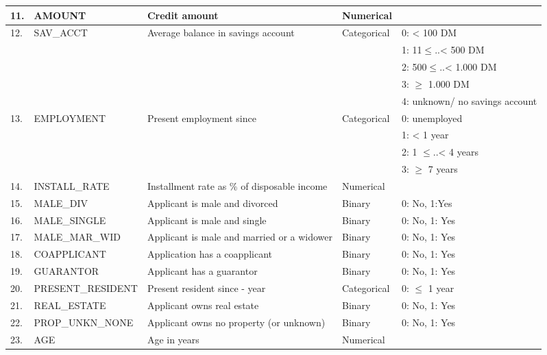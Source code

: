 \begin{table}
\begin{tabular}{|p{0.6cm}|p{2.6cm}|p{5cm}|p{2cm}|p{4.5cm}|}
	{\tiny 11.}	& {\tiny AMOUNT} & {\tiny Credit amount}  & {\tiny Numerical} &  \\ \hline
	{\tiny 12.}	& {\tiny SAV\_ACCT} & {\tiny Average balance in savings account} & {\tiny Categorical} & {\tiny 0: < 100 DM} \\
		&  &  &  & {\tiny 1: 11$\leq$..< 500 DM}\\
		&  &  &  & {\tiny 2: 500$\leq$..< 1.000 DM} \\
		&  &  &  & {\tiny 3: $\geq$ 1.000 DM} \\
		&  &  &  &{\tiny  4: unknown/ no savings account} \\ \hline
	{\tiny 13.}	& {\tiny EMPLOYMENT} & {\tiny Present employment since} & {\tiny Categorical}  & {\tiny 0: unemployed} \\
		&  &  &  & {\tiny 1: < 1 year}\\
		&  &  &  & {\tiny 2: 1 $\leq$..< 4 years} \\
		&  &  &  & {\tiny 3: $\geq$ 7 years} \\ \hline
	{\tiny 14.}	& {\tiny INSTALL\_RATE}  & {\tiny Installment rate as \% of disposable income} & {\tiny Numerical}  &  \\ \hline
	{\tiny 15.}	& {\tiny MALE\_DIV} & {\tiny Applicant is male and divorced} & {\tiny Binary} & {\tiny 0: No, 1:Yes} \\ \hline
	{\tiny 16.	}& {\tiny MALE\_SINGLE} & {\tiny Applicant is male and single} & {\tiny Binary} & {\tiny 0: No, 1: Yes} \\ \hline
	{\tiny 17.}	& {\tiny MALE\_MAR\_WID} & {\tiny Applicant is male and married or a widower} & {\tiny Binary}  & {\tiny 0: No, 1: Yes }\\ \hline
	{\tiny 18.} & {\tiny CO\-APPLICANT} & {\tiny Application has a co\-applicant} & {\tiny Binary} & {\tiny 0: No, 1: Yes} \\ \hline
	{\tiny 19.} & {\tiny GUARANTOR} & {\tiny Applicant has a guarantor} & {\tiny Binary} & {\tiny 0: No, 1: Yes} \\ \hline
	{\tiny 20.} & {\tiny PRESENT\_RESIDENT} & {\tiny Present resident since - year} & {\tiny Categorical} &{\tiny  0: $\leq$ 1 year} \\ \hline
	{\tiny 21.} & {\tiny REAL\_ESTATE }& {\tiny Applicant owns real estate} & {\tiny Binary} & {\tiny 0: No, 1: Yes} \\ \hline
	{\tiny 22.} & {\tiny PROP\_UNKN\_NONE} & {\tiny Applicant owns no property (or unknown)} & {\tiny Binary} & {\tiny 0: No, 1: Yes} \\ \hline
	{\tiny 23.} & {\tiny AGE} & {\tiny Age in years} & {\tiny Numerical} & \\ \hline

\end{tabular}
\end{table}
